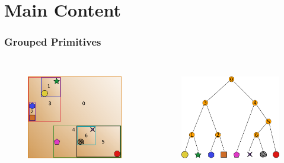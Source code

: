 \documentclass{beamer}
\begin{document}
\section{Main Content}

\begin{frame}
  \frametitle{Grouped Primitives}
  
\begin{columns}[t]

\begin{figure}
\includegraphics[height=45mm]{primitive-box.png}
\end{figure}

\begin{figure}
\includegraphics[height=45mm]{primitive_tree_narrow.png}
\end{figure}
\end{columns}
\end{frame}

\end{document}
